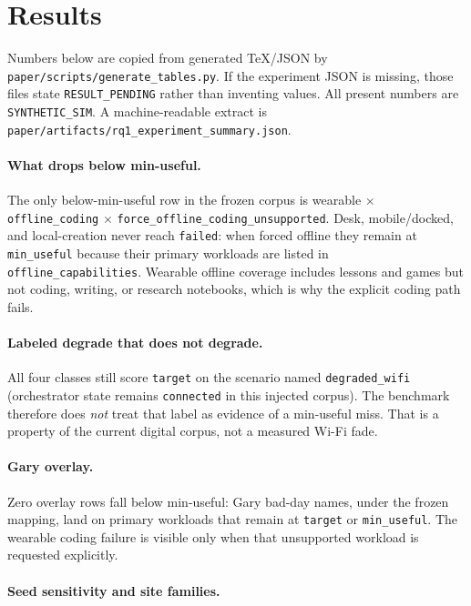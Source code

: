 \section{Results}
\label{sec:results}
Numbers below are copied from generated TeX/JSON by \texttt{paper/scripts/generate\_tables.py}.
If the experiment JSON is missing, those files state \texttt{RESULT\_PENDING} rather than inventing values.
All present numbers are \texttt{SYNTHETIC\_SIM}.
A machine-readable extract is \texttt{paper/artifacts/rq1\_experiment\_summary.json}.

\paragraph{What drops below min-useful.}




The only below-min-useful row in the frozen corpus is wearable $\times$ \texttt{offline\_coding} $\times$ \texttt{force\_offline\_coding\_unsupported}.
Desk, mobile/docked, and local-creation never reach \texttt{failed}: when forced offline they remain at \texttt{min\_useful} because their primary workloads are listed in \texttt{offline\_capabilities}.
Wearable offline coverage includes lessons and games but not coding, writing, or research notebooks, which is why the explicit coding path fails.

\paragraph{Labeled degrade that does not degrade.}
All four classes still score \texttt{target} on the scenario named \texttt{degraded\_wifi} (orchestrator state remains \texttt{connected} in this injected corpus).
The benchmark therefore does \emph{not} treat that label as evidence of a min-useful miss.
That is a property of the current digital corpus, not a measured Wi-Fi fade.

\paragraph{Gary overlay.}

Zero overlay rows fall below min-useful: Gary bad-day names, under the frozen mapping, land on primary workloads that remain at \texttt{target} or \texttt{min\_useful}.
The wearable coding failure is visible only when that unsupported workload is requested explicitly.

\paragraph{Seed sensitivity and site families.}




